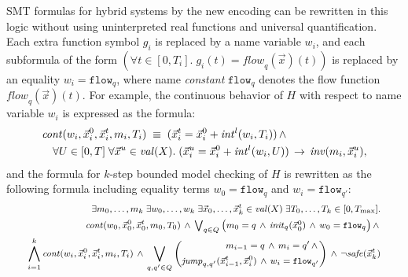 SMT formulas for hybrid systems by the new encoding
can be rewritten in this logic without using uninterpreted real functions 
and universal quantification.
Each extra function symbol $g_i$ is replaced by a name variable $w_i$, and
each subformula of the form $(\forall t \in [0,T_i].\; g_i(t) = \mathit{flow}_q(\vec{x})(t))$
is replaced by an equality $w_i = \texttt{flow}_q$,
where name \emph{constant} $\texttt{flow}_q$ denotes the flow function $\mathit{flow}_q(\vec{x})(t)$.
For example, 
the continuous behavior of $H$ with respect to name variable $w_i$
is expressed as the formula:
\[
\begin{multlined}
\mathit{cont}(w_i, \vec{x}_i^0, \vec{x}_i^t, m_i, T_i) \;\equiv\;
(\vec{x}_i^t = \vec{x}_i^0 + \mathit{int}^l(w_i, T_i))
\,\wedge\,
\\
\forall U \in [0,T]\;
\forall \vec{x}^u \in \val(X).\;
(\vec{x}_i^u = \vec{x}_i^0 + \mathit{int}^l(w_i, U)) \,\to\, \mathit{inv}(m_i,\vec{x}_i^u),
\end{multlined}
\]
and the formula for $k$-step bounded model checking of $H$
is rewritten as the following formula including equality terms  $w_0 = \texttt{flow}_q$ and $w_i = \texttt{flow}_{q'}$:
\[
\begin{medsize}
\begin{alignedat}{2}
\exists m_0,\ldots,m_k\;
\exists w_0,\ldots,w_k\;
\exists \vec{x}_0, \ldots, %
\vec{x}_k^t \in \val(X)\;
\exists T_0, \ldots, T_k \in [0,T_{\max}].
\\
\mathit{cont}(w_0, \vec{x}_0^0, \vec{x}_0^t, m_0, T_0)
\,\wedge\,
\textstyle
\bigvee_{q \in Q}
\big(
m_0 = q 
\,\wedge\,
\mathit{init}_q(\vec{x}_0^0) 
\,\wedge\,
w_0 = \texttt{flow}_q
\big)
\,\wedge\,
\\
\bigwedge_{i = 1}^k 
\mathit{cont}(w_i,\vec{x}_i^0, \vec{x}_i^t, m_i, T_i)
\,\wedge\,
\bigvee_{q, q' \in Q}
\left(
\begin{aligned}
m_{i-1} = {q}
\,\wedge\,
m_i = {q'}
\,\wedge\,
\\
\mathit{jump}_{q,q'}(\vec{x}_{i-1}^t,\vec{x}_{i}^0)
\,\wedge\,
w_i = \texttt{flow}_{q'}
\end{aligned}
\right)
\,\wedge\,
\neg \mathit{safe}(\vec{x}_k^t)
\end{alignedat}
\end{medsize}
\]


